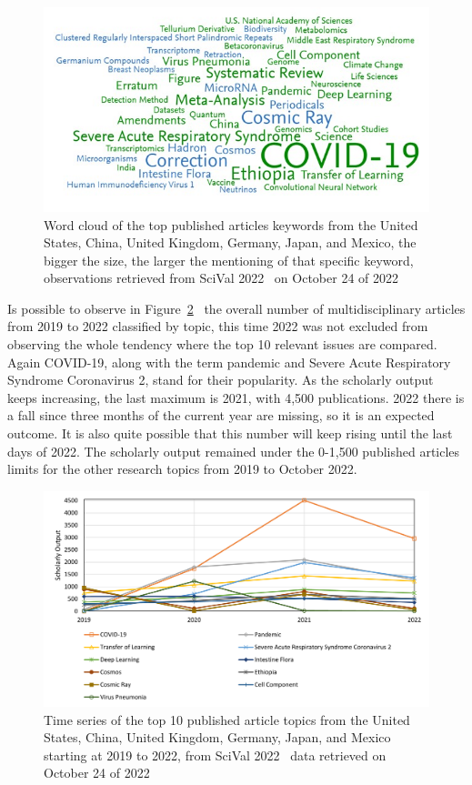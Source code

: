 \documentclass[conference]{IEEEtran}
\begin{document}
\begin{figure}[H]
    \centering
    \includegraphics[width = 8 cm]{Keywords.jpg}
    \caption{Word cloud of the top published articles keywords from the United States, China, United Kingdom, Germany, Japan, and Mexico, the bigger the size, the larger the mentioning of that specific keyword, observations retrieved from SciVal 2022~\cite{Scival2022} on October 24 of 2022}
    \label{fig:Keywords}
\end{figure}

Is possible to observe in Figure~\ref{fig:Multi}~\cite{Scival2022} the overall number of multidisciplinary articles from 2019 to 2022 classified by topic, this time 2022 was not excluded from observing the whole tendency where the top 10 relevant issues are compared. Again COVID-19, along with the term pandemic and Severe Acute Respiratory Syndrome Coronavirus 2, stand for their popularity. As the scholarly output keeps increasing, the last maximum is 2021, with 4,500 publications. 2022 there is a fall since three months of the current year are missing, so it is an expected outcome. It is also quite possible that this number will keep rising until the last days of 2022. The scholarly output remained under the 0-1,500 published articles limits for the other research topics from 2019 to October 2022.

\begin{figure}[H]
    \centering
    \includegraphics[width = 9 cm]{Multi.png}
    \caption{Time series of the top 10 published article topics from the United States, China, United Kingdom, Germany, Japan, and Mexico starting at 2019 to 2022, from SciVal 2022~\cite{Scival2022} data retrieved on October 24 of 2022}
    \label{fig:Multi}
\end{figure}
\end{document}
